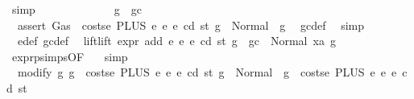 \begin{isabellebody}
\ simp\isanewline
\ \ \ \ \isamarkupfalse%
\isanewline
\ \ \ \ \ \ \isamarkupfalse%
\ {\isachardoublequoteopen}{\isasymnot}\ g\ {\isasymle}\ gc{\isachardoublequoteclose}\isanewline
\ \ \ \ \ \ \isamarkupfalse%
\ \isamarkupfalse%
\ {\isacharasterisk}{\kern0pt}{\isacharcolon}{\kern0pt}\ {\isachardoublequoteopen}assert\ Gas\ {\isacharparenleft}{\kern0pt}{\isacharparenleft}{\kern0pt}{\isacharless}{\kern0pt}{\isacharparenright}{\kern0pt}\ {\isacharparenleft}{\kern0pt}costs\isactrlsub e\ {\isacharparenleft}{\kern0pt}PLUS\ e{}\ e{}{\isacharparenright}{\kern0pt}\ e\ cd\ st{\isacharparenright}{\kern0pt}{\isacharparenright}{\kern0pt}\ g\ {\isacharequal}{\kern0pt}\ Normal\ {\isacharparenleft}{\kern0pt}{\isacharparenleft}{\kern0pt}{\isacharparenright}{\kern0pt}{\isacharcomma}{\kern0pt}\ g{\isacharparenright}{\kern0pt}{\isachardoublequoteclose}\ \isamarkupfalse%
\ gc{\isacharunderscore}{\kern0pt}def\ \isamarkupfalse%
\ simp\isanewline
\ \ \ \ \ \ \isamarkupfalse%
\ {}{}{\isacharparenleft}{\kern0pt}{}{\isacharparenright}{\kern0pt}\ e{\isacharunderscore}{\kern0pt}def\ gc{\isacharunderscore}{\kern0pt}def\ \isamarkupfalse%
\ lift{\isacharcolon}{\kern0pt}{\isachardoublequoteopen}lift\ expr\ add\ e{}\ e{}\ e\ cd\ st\ {\isacharparenleft}{\kern0pt}g\ {\isacharminus}{\kern0pt}\ gc{\isacharparenright}{\kern0pt}\ {\isacharequal}{\kern0pt}\ Normal\ {\isacharparenleft}{\kern0pt}xa{\isacharcomma}{\kern0pt}\ g{}{\isacharparenright}{\kern0pt}{\isachardoublequoteclose}\ \isamarkupfalse%
\ expr{\isachardot}{\kern0pt}psimps{\isacharparenleft}{\kern0pt}{}{}{\isacharparenright}{\kern0pt}{\isacharbrackleft}{\kern0pt}OF\ {}{}{\isacharparenleft}{\kern0pt}{}{\isacharparenright}{\kern0pt}{\isacharbrackright}{\kern0pt}\ \isamarkupfalse%
\ simp\isanewline
\ \ \ \ \ \ \isamarkupfalse%
\ \isamarkupfalse%
\ {\isacharasterisk}{\kern0pt}{\isacharasterisk}{\kern0pt}{\isacharcolon}{\kern0pt}\ {\isachardoublequoteopen}modify\ {\isacharparenleft}{\kern0pt}{\isasymlambda}g{\isachardot}{\kern0pt}\ g\ {\isacharminus}{\kern0pt}\ costs\isactrlsub e\ {\isacharparenleft}{\kern0pt}PLUS\ e{}\ e{}{\isacharparenright}{\kern0pt}\ e\ cd\ st{\isacharparenright}{\kern0pt}\ g\ {\isacharequal}{\kern0pt}\ Normal\ {\isacharparenleft}{\kern0pt}{\isacharparenleft}{\kern0pt}{\isacharparenright}{\kern0pt}{\isacharcomma}{\kern0pt}\ g\ {\isacharminus}{\kern0pt}\ costs\isactrlsub e\ {\isacharparenleft}{\kern0pt}PLUS\ e{}\ e{}{\isacharparenright}{\kern0pt}\ e\ cd\ st{\isacharparenright}{\kern0pt}{\isachardoublequoteclose}\ \isamarkupfalse%

\end{isabellebody}
